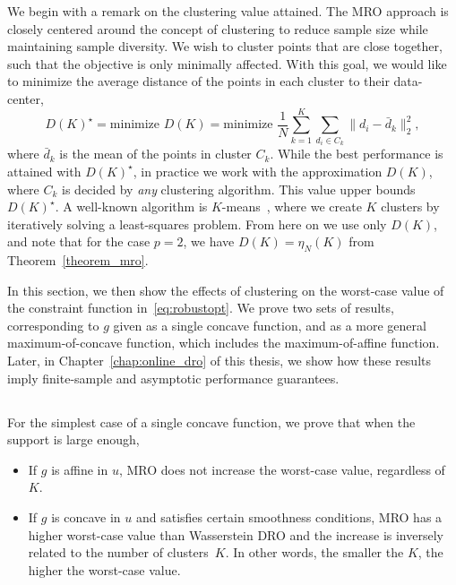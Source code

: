 {We begin with a remark on the clustering value attained. The \gls{MRO} approach is closely centered around the concept of clustering to reduce sample size while maintaining sample diversity.
We wish to cluster points that are close together, such that the objective is only minimally affected. With this goal, we would like to minimize the average distance of the points in each cluster to their data-center,
\begin{equation*}
	D(K)^\star =\text{minimize } D(K) =  \text{minimize } \frac{1}{N}\sum_{k=1}^K \sum_{d_i \in C_k} \| d_i - \bar{d}_k \|^2_2,
\end{equation*}
	where $\bar{d}_k$ is the mean of the points in cluster $C_k$.
	While the best performance is attained with $D(K)^\star$, in practice we work with the approximation $D(K)$, where $C_k$ is decided by {\it any} clustering algorithm. This value upper bounds $D(K)^\star$. A well-known algorithm is $K$-means~\citep{kmeans}, where we create $K$ clusters by iteratively solving a least-squares problem.
	From here on we use only $D(K)$, and note that for the case $p=2$, we have $D(K)=\eta_N(K)$ from Theorem~\ref{theorem_mro}.

In this section, we then show the effects of clustering on the worst-case value of the constraint function in~\eqref{eq:robustopt}.
We prove two sets of results, corresponding to $g$ given as a single concave function, and as a more general maximum-of-concave function, which includes the maximum-of-affine function. Later, in Chapter~\ref{chap:online_dro} of this thesis, we show how these results imply finite-sample and asymptotic performance guarantees. 


\subsection{}
\label{sub:single-con}
For the simplest case of a single concave function, we prove that when the support is large enough,
\begin{itemize}
	\item If $g$ is affine in $u$, \gls{MRO} does not increase the worst-case value, regardless of $K$.
	\item If $g$ is concave in $u$ and satisfies certain smoothness conditions, \gls{MRO} has a higher worst-case value than Wasserstein \gls{DRO} and the increase is inversely related to the number of clusters~$K$. In other words, the smaller the $K$, the higher the worst-case value.
\end{itemize}

}
